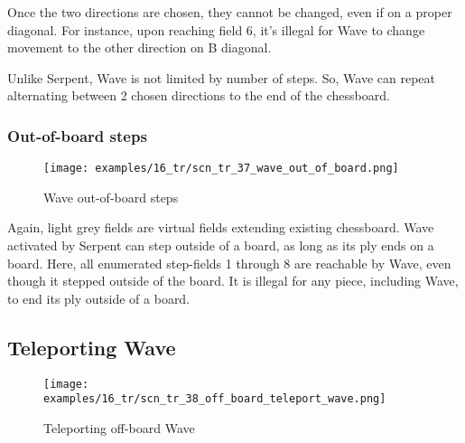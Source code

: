 Once the two directions are chosen, they cannot be changed, even if on a
proper diagonal. For instance, upon reaching field 6, it's illegal for Wave
to change movement to the other direction on B diagonal.

Unlike Serpent, Wave is not limited by number of steps. So, Wave can repeat
alternating between 2 chosen directions to the end of the chessboard.

\clearpage %

\subsubsection*{Out-of-board steps}
\label{sec:Tamoanchan Revisited/Serpent/Activating Wave/Out-of-board steps}

\vspace*{-1.0\baselineskip}
\noindent
\begin{figure}[!h]
\texttt{[image: examples/16\_tr/scn\_tr\_37\_wave\_out\_of\_board.png]}
\caption{Wave out-of-board steps}
\label{fig:scn_tr_37_wave_out_of_board}
\end{figure}

Again, light grey fields are virtual fields extending existing chessboard.
Wave activated by Serpent can step outside of a board, as long as its ply
ends on a board. Here, all enumerated step-fields 1 through 8 are reachable
by Wave, even though it stepped outside of the board. It is illegal for any
piece, including Wave, to end its ply outside of a board.

\clearpage %

\subsection*{Teleporting Wave}
\label{sec:Tamoanchan Revisited/Serpent/Teleporting Wave}

\vspace*{-1.0\baselineskip}
\noindent
\begin{figure}[!h]
\texttt{[image: examples/16\_tr/scn\_tr\_38\_off\_board\_teleport\_wave.png]}
\caption{Teleporting off-board Wave}
\label{fig:scn_tr_38_off_board_teleport_wave}
\end{figure}

